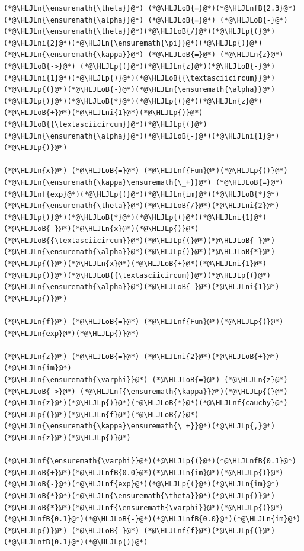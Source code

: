 \documentclass[12pt,a4paper]{article}
\newcommand{\HLJLn}[1]{#1}
\newcommand{\HLJLnf}[1]{\textcolor[RGB]{66,102,213}{#1}}
\newcommand{\HLJLnfB}[1]{\textcolor[RGB]{59,151,46}{#1}}
\newcommand{\HLJLni}[1]{\textcolor[RGB]{59,151,46}{#1}}
\newcommand{\HLJLoB}[1]{\textcolor[RGB]{102,102,102}{\textbf{#1}}}
\newcommand{\HLJLp}[1]{#1}
\begin{document}
\begin{lstlisting}
(*@\HLJLn{\ensuremath{\theta}}@*) (*@\HLJLoB{=}@*)(*@\HLJLnfB{2.3}@*)
(*@\HLJLn{\ensuremath{\alpha}}@*) (*@\HLJLoB{=}@*) (*@\HLJLoB{-}@*)(*@\HLJLn{\ensuremath{\theta}}@*)(*@\HLJLoB{/}@*)(*@\HLJLp{(}@*)(*@\HLJLni{2}@*)(*@\HLJLn{\ensuremath{\pi}}@*)(*@\HLJLp{)}@*)
(*@\HLJLn{\ensuremath{\kappa}}@*) (*@\HLJLoB{=}@*) (*@\HLJLn{z}@*) (*@\HLJLoB{->}@*) (*@\HLJLp{(}@*)(*@\HLJLn{z}@*)(*@\HLJLoB{-}@*)(*@\HLJLni{1}@*)(*@\HLJLp{)}@*)(*@\HLJLoB{{\textasciicircum}}@*)(*@\HLJLp{(}@*)(*@\HLJLoB{-}@*)(*@\HLJLn{\ensuremath{\alpha}}@*)(*@\HLJLp{)}@*)(*@\HLJLoB{*}@*)(*@\HLJLp{(}@*)(*@\HLJLn{z}@*)(*@\HLJLoB{+}@*)(*@\HLJLni{1}@*)(*@\HLJLp{)}@*)(*@\HLJLoB{{\textasciicircum}}@*)(*@\HLJLp{(}@*)(*@\HLJLn{\ensuremath{\alpha}}@*)(*@\HLJLoB{-}@*)(*@\HLJLni{1}@*)(*@\HLJLp{)}@*)

(*@\HLJLn{x}@*) (*@\HLJLoB{=}@*) (*@\HLJLnf{Fun}@*)(*@\HLJLp{()}@*)
(*@\HLJLn{\ensuremath{\kappa}\ensuremath{\_+}}@*) (*@\HLJLoB{=}@*) (*@\HLJLnf{exp}@*)(*@\HLJLp{(}@*)(*@\HLJLn{im}@*)(*@\HLJLoB{*}@*)(*@\HLJLn{\ensuremath{\theta}}@*)(*@\HLJLoB{/}@*)(*@\HLJLni{2}@*)(*@\HLJLp{)}@*)(*@\HLJLoB{*}@*)(*@\HLJLp{(}@*)(*@\HLJLni{1}@*)(*@\HLJLoB{-}@*)(*@\HLJLn{x}@*)(*@\HLJLp{)}@*)(*@\HLJLoB{{\textasciicircum}}@*)(*@\HLJLp{(}@*)(*@\HLJLoB{-}@*)(*@\HLJLn{\ensuremath{\alpha}}@*)(*@\HLJLp{)}@*)(*@\HLJLoB{*}@*)(*@\HLJLp{(}@*)(*@\HLJLn{x}@*)(*@\HLJLoB{+}@*)(*@\HLJLni{1}@*)(*@\HLJLp{)}@*)(*@\HLJLoB{{\textasciicircum}}@*)(*@\HLJLp{(}@*)(*@\HLJLn{\ensuremath{\alpha}}@*)(*@\HLJLoB{-}@*)(*@\HLJLni{1}@*)(*@\HLJLp{)}@*)

(*@\HLJLn{f}@*) (*@\HLJLoB{=}@*) (*@\HLJLnf{Fun}@*)(*@\HLJLp{(}@*)(*@\HLJLn{exp}@*)(*@\HLJLp{)}@*)

(*@\HLJLn{z}@*) (*@\HLJLoB{=}@*) (*@\HLJLni{2}@*)(*@\HLJLoB{+}@*)(*@\HLJLn{im}@*)
(*@\HLJLn{\ensuremath{\varphi}}@*) (*@\HLJLoB{=}@*) (*@\HLJLn{z}@*) (*@\HLJLoB{->}@*) (*@\HLJLnf{\ensuremath{\kappa}}@*)(*@\HLJLp{(}@*)(*@\HLJLn{z}@*)(*@\HLJLp{)}@*)(*@\HLJLoB{*}@*)(*@\HLJLnf{cauchy}@*)(*@\HLJLp{(}@*)(*@\HLJLn{f}@*)(*@\HLJLoB{/}@*)(*@\HLJLn{\ensuremath{\kappa}\ensuremath{\_+}}@*)(*@\HLJLp{,}@*) (*@\HLJLn{z}@*)(*@\HLJLp{)}@*)

(*@\HLJLnf{\ensuremath{\varphi}}@*)(*@\HLJLp{(}@*)(*@\HLJLnfB{0.1}@*)(*@\HLJLoB{+}@*)(*@\HLJLnfB{0.0}@*)(*@\HLJLn{im}@*)(*@\HLJLp{)}@*)(*@\HLJLoB{-}@*)(*@\HLJLnf{exp}@*)(*@\HLJLp{(}@*)(*@\HLJLn{im}@*)(*@\HLJLoB{*}@*)(*@\HLJLn{\ensuremath{\theta}}@*)(*@\HLJLp{)}@*)(*@\HLJLoB{*}@*)(*@\HLJLnf{\ensuremath{\varphi}}@*)(*@\HLJLp{(}@*)(*@\HLJLnfB{0.1}@*)(*@\HLJLoB{-}@*)(*@\HLJLnfB{0.0}@*)(*@\HLJLn{im}@*)(*@\HLJLp{)}@*) (*@\HLJLoB{-}@*) (*@\HLJLnf{f}@*)(*@\HLJLp{(}@*)(*@\HLJLnfB{0.1}@*)(*@\HLJLp{)}@*)
\end{lstlisting}
\end{document}
